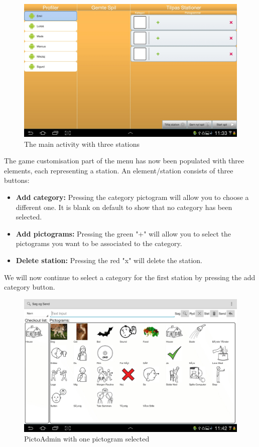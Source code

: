 \begin{figure}[H]
\centering
\includegraphics[width=0.9\linewidth]{img/screenshots/profile_flow_2.jpg}%
\caption{The main activity with three stations}
\label{fig:profile_flow_2}
\end{figure}

The game customisation part of the menu has now been populated with three elements, each representing a station. An element/station consists of three buttons:
\begin{itemize}
\item \textbf{Add category:} Pressing the category pictogram will allow you to choose a different one. It is blank on default to show that no category has been selected.
\item \textbf{Add pictograms:} Pressing the green "+" will allow you to select the pictograms you want to be associated to the category.
\item \textbf{Delete station:} Pressing the red "x" will delete the station.
\end{itemize}
We will now continue to select a category for the first station by pressing the add category button.

\begin{figure}[H]
\centering
\includegraphics[width=0.9\linewidth]{img/screenshots/profile_flow_3.jpg}%
\caption{PictoAdmin with one pictogram selected}
\label{fig:profile_flow_3}
\end{figure}

